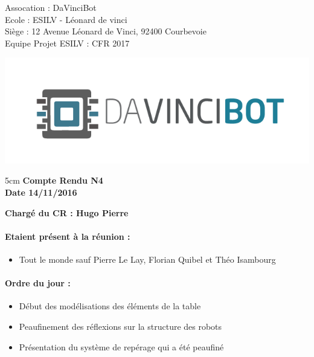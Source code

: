 \documentclass[12pt]{report}
\begin{document}
\begin{minipage}{0.55\linewidth}
\noindent Assocation : DaVinciBot\\
Ecole : ESILV - Léonard de vinci\\
Siège :  12 Avenue Léonard de Vinci, 92400 Courbevoie\\
Equipe Projet ESILV : CFR 2017\\
\end{minipage}\hfill
\begin{minipage}{0.3\linewidth}
\includegraphics[scale = 0.2]{img/logo_assos.png}
\end{minipage}
\vspace{1cm}



\begin{center}
\begin {boxedminipage} [ poslb ] { 5cm}
\textbf{Compte Rendu N4}\\
\textbf{Date 14/11/2016}
\end {boxedminipage}
\end{center}
\textbf{Chargé du CR : Hugo Pierre}

\vspace{1cm}

\paragraph{Etaient présent à la réunion :}
\begin{itemize}
\item Tout le monde sauf Pierre Le Lay, Florian Quibel et Théo Isambourg 
\end{itemize}


\paragraph{Ordre du jour :}
\begin{itemize}
\item Début des modélisations des éléments de la table
\item Peaufinement des réflexions sur la structure des robots
\item Présentation du système de  repérage qui a été peaufiné
\end{itemize}
\end{document}
